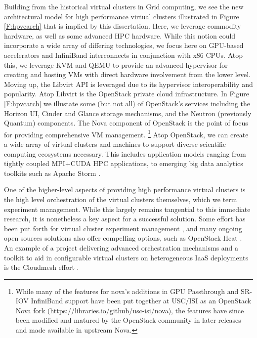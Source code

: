 Building from the historical virtual clusters in Grid computing, we see the new architectural model for high performance virtual clusters illustrated in Figure \ref{F:hpvcarch} that is implied by this dissertation.  Here, we leverage commodity hardware, as well as some advanced HPC hardware. While this notion could incorporate a wide array of differing technologies, we focus here on GPU-based accelerators and InfiniBand interconnects in conjunction with x86 CPUs. Atop this, we leverage KVM and QEMU to provide an advanced hypervisor for creating and hosting VMs with direct hardware involvement from the lower level. Moving up, the Libvirt API is leveraged due to its hypervisor interoperability and popularity. Atop Libvirt is the OpenStack private cloud infrastructure. In Figure \ref{F:hpvcarch} we illustate some (but not all) of OpenStack's services including the Horizon UI, Cinder and Glance storage mechanisms, and the Neutron (previously Quantum) components. The Nova component of OpenStack is the point of focus for providing comprehensive VM management.
\footnote{While many of the features for nova's additions in GPU Passthrough and SR-IOV InfiniBand support have been put together at USC/ISI as an OpenStack Nova fork (https://libraries.io/github/usc-isi/nova), the features have since been modified and matured by the OpenStack community in later releases and made available in upstream Nova.}  Atop OpenStack, we can create a wide array of virtual clusters and machines to support diverse scientific computing ecosystems necessary. This includes application models ranging from tightly coupled MPI+CUDA HPC applications, to emerging big data analytics toolkits such as Apache Storm \cite{kamburugamuve2016streaming}. 

One of the higher-level aspects of providing high performance virtual clusters is the high level orchestration of the virtual clusters themselves, which we term experiment management. While this largely remains tangential to this immediate research, it is nonetheless a key aspect for a successful solution. Some effort has been put forth for virtual cluster experiment management \cite{las2010gce}, and many ongoing open sources solutions also offer compelling options, such as OpenStack Heat \cite{www-openstack-heat}.  An example of a project delivering advanced orchestration mechanisms and a toolkit to aid in configurable virtual clusters on heterogeneous IaaS deployments is the Cloudmesh effort \cite{von2014cloudmesh}.  


